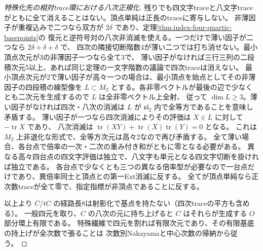 \begin{proof}[特殊化先の相対trace環における八次正規化]
残りでも四文字traceと八文字traceがともに全て消えることはない。頂点単純は正長のtraceに寄与しない。
非薄因子が重複込みで二つなら双方が $2\delta$ であり、定理\ref{thm:index-four-quartic-basepoints}の
復元と逆符号対の八次非消滅を使える。一つだけで薄い因子が二つなら $2\delta+\delta+\delta$ で、
四次の隣接切断階数4が薄い二つでは打ち消せない。最小頂点次元が3の非薄因子一つなら全て3で、
薄い因子がなければ三行三列の二段積次元5以上、あれば同じ定理の一文字階数の議論で四次traceは消えない。
最小頂点次元が2で薄い因子が高々一つの場合は、最小頂点を始点としてその非薄因子の四段積の線型像を
$L\subset M_2$ とする。各非零ベクトルが最後の辺で少なくとも二次元を生成するので $L$ は全非零ベクトル上全射、
従って $\dim L\ge3$。薄い因子がなければ四次・八次の消滅は $L$ が $\mathfrak{sl}_2$ 内で全等方であることを意味し矛盾する。
薄い因子が一つなら四次消滅によりその評価は $X\in L$ に対して $-\operatorname{tr}X$ であり、
八次消滅は $\operatorname{tr}(XY)+\operatorname{tr}(X)\operatorname{tr}(Y)=0$ となる。
これは $M_2$ 上非退化な形式で、全等方次元は高々2なので再び矛盾する。
全て薄い場合、各台点で倍率の一次・二次の重み付き和がともに零となる必要がある。
異なる高々四台点の四文字評価は独立で、八文字も単元となる四文字切断を掛ければ独立である。
各台点で少なくとも三つの異なる倍率型が必要なので一台点だけであり、異倍率同士と頂点との第一Ext消滅に反する。
全てが頂点単純なら正次数traceが全て零で、指定指標が非頂点であることに反する。

以上より $C/tC$ の経路長8は射影化で基点を持たない（四次traceの平方も含める）。
一般四元を取り、$C$ の八次の元に持ち上げると $C$ はそれらが生成する $O$ 部分環上有限である。
特殊繊維で四元を割れば有限次元であり、その有限基底の持上げが全次数で張ることは
次数別Nakayamaと中心次数の帰納から従う。
\end{proof}

